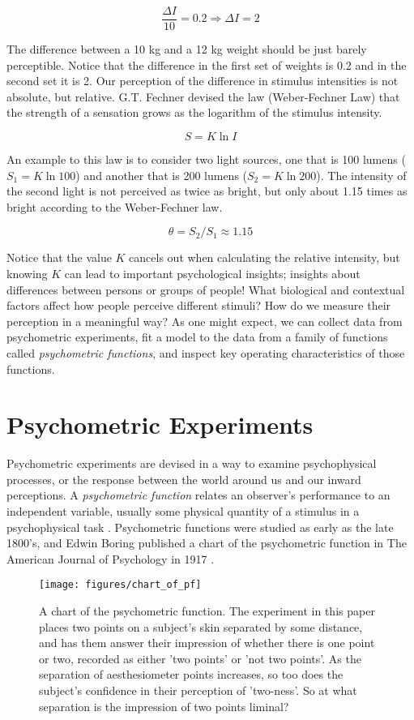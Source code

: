 \documentclass[11pt, oneside, openany]{scrbook}
\begin{document}
\[
\frac{\Delta I}{10} = 0.2 \Rightarrow \Delta I = 2
\]

The difference between a 10 kg and a 12 kg weight should be just barely perceptible. Notice that the difference in the first set of weights is 0.2 and in the second set it is 2. Our perception of the difference in stimulus intensities is not absolute, but relative. G.T. Fechner devised the law (Weber-Fechner Law) that the strength of a sensation grows as the logarithm of the stimulus intensity.

\[S = K \ln I\]

An example to this law is to consider two light sources, one that is 100 lumens (\(S_1 = K \ln 100\)) and another that is 200 lumens (\(S_2 = K \ln 200\)). The intensity of the second light is not perceived as twice as bright, but only about 1.15 times as bright according to the Weber-Fechner law.

\[\theta = S_2 / S_1 \approx 1.15\]

Notice that the value \(K\) cancels out when calculating the relative intensity, but knowing \(K\) can lead to important psychological insights; insights about differences between persons or groups of people! What biological and contextual factors affect how people perceive different stimuli? How do we measure their perception in a meaningful way? As one might expect, we can collect data from psychometric experiments, fit a model to the data from a family of functions called \emph{psychometric functions}, and inspect key operating characteristics of those functions.

\hypertarget{psycho-experiments}{%
\section{Psychometric Experiments}\label{psycho-experiments}}

Psychometric experiments are devised in a way to examine psychophysical processes, or the response between the world around us and our inward perceptions. A \emph{psychometric function} relates an observer's performance to an independent variable, usually some physical quantity of a stimulus in a psychophysical task \citep{wichmann2001a}. Psychometric functions were studied as early as the late 1800's, and Edwin Boring published a chart of the psychometric function in The American Journal of Psychology in 1917 \citep{boring1917chart}.

\begin{figure}

{\centering \texttt{[image: figures/chart\_of\_pf]} 

}

\caption{A chart of the psychometric function. The experiment in this paper places two points on a subject's skin separated by some distance, and has them answer their impression of whether there is one point or two, recorded as either 'two points' or 'not two points'. As the separation of aesthesiometer points increases, so too does the subject's confidence in their perception of 'two-ness'. So at what separation is the impression of two points liminal?}\label{fig:ch020-chart-of-pf}
\end{figure}
\end{document}
